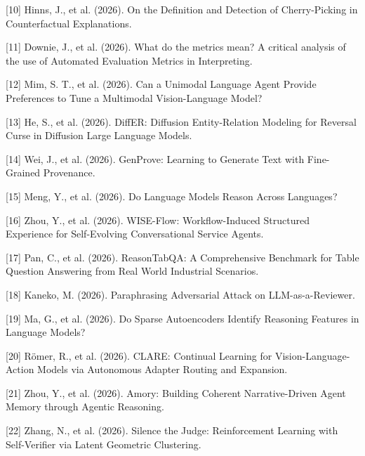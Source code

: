 \documentclass{article}
\begin{document}
[10] Hinns, J., et al. (2026). On the Definition and Detection of Cherry-Picking in Counterfactual Explanations.

[11] Downie, J., et al. (2026). What do the metrics mean? A critical analysis of the use of Automated Evaluation Metrics in Interpreting.

[12] Mim, S. T., et al. (2026). Can a Unimodal Language Agent Provide Preferences to Tune a Multimodal Vision-Language Model?

[13] He, S., et al. (2026). DiffER: Diffusion Entity-Relation Modeling for Reversal Curse in Diffusion Large Language Models.

[14] Wei, J., et al. (2026). GenProve: Learning to Generate Text with Fine-Grained Provenance.

[15] Meng, Y., et al. (2026). Do Language Models Reason Across Languages?

[16] Zhou, Y., et al. (2026). WISE-Flow: Workflow-Induced Structured Experience for Self-Evolving Conversational Service Agents.

[17] Pan, C., et al. (2026). ReasonTabQA: A Comprehensive Benchmark for Table Question Answering from Real World Industrial Scenarios.

[18] Kaneko, M. (2026). Paraphrasing Adversarial Attack on LLM-as-a-Reviewer.

[19] Ma, G., et al. (2026). Do Sparse Autoencoders Identify Reasoning Features in Language Models?

[20] Römer, R., et al. (2026). CLARE: Continual Learning for Vision-Language-Action Models via Autonomous Adapter Routing and Expansion.

[21] Zhou, Y., et al. (2026). Amory: Building Coherent Narrative-Driven Agent Memory through Agentic Reasoning.

[22] Zhang, N., et al. (2026). Silence the Judge: Reinforcement Learning with Self-Verifier via Latent Geometric Clustering.
\end{document}
